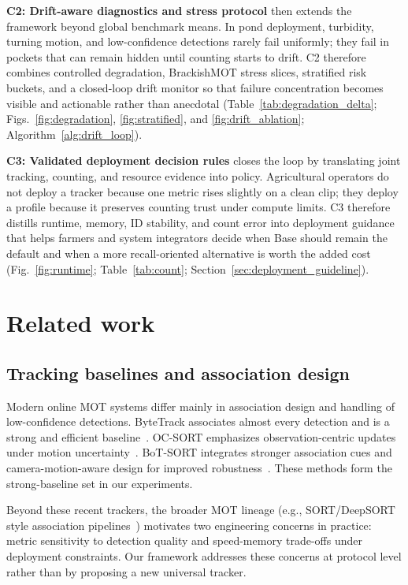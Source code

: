 \documentclass[5p,twocolumn,a4paper]{elsarticle}
\begin{document}
\textbf{C2: Drift-aware diagnostics and stress protocol} then extends the framework beyond global benchmark means. In pond deployment, turbidity, turning motion, and low-confidence detections rarely fail uniformly; they fail in pockets that can remain hidden until counting starts to drift. C2 therefore combines controlled degradation, BrackishMOT stress slices, stratified risk buckets, and a closed-loop drift monitor so that failure concentration becomes visible and actionable rather than anecdotal (Table~\ref{tab:degradation_delta}; Figs.~\ref{fig:degradation}, \ref{fig:stratified}, and \ref{fig:drift_ablation}; Algorithm~\ref{alg:drift_loop}).

\textbf{C3: Validated deployment decision rules} closes the loop by translating joint tracking, counting, and resource evidence into policy. Agricultural operators do not deploy a tracker because one metric rises slightly on a clean clip; they deploy a profile because it preserves counting trust under compute limits. C3 therefore distills runtime, memory, ID stability, and count error into deployment guidance that helps farmers and system integrators decide when Base should remain the default and when a more recall-oriented alternative is worth the added cost (Fig.~\ref{fig:runtime}; Table~\ref{tab:count}; Section~\ref{sec:deployment_guideline}).

\section{Related work}
\subsection{Tracking baselines and association design}
Modern online MOT systems differ mainly in association design and handling of low-confidence detections. ByteTrack associates almost every detection and is a strong and efficient baseline~\cite{bytetrack2022}. OC-SORT emphasizes observation-centric updates under motion uncertainty~\cite{ocsort2022}. BoT-SORT integrates stronger association cues and camera-motion-aware design for improved robustness~\cite{botsort2022}. These methods form the strong-baseline set in our experiments.

Beyond these recent trackers, the broader MOT lineage (e.g., SORT/DeepSORT style association pipelines~\cite{sort2016,deepsort2017}) motivates two engineering concerns in practice: metric sensitivity to detection quality and speed-memory trade-offs under deployment constraints. Our framework addresses these concerns at protocol level rather than by proposing a new universal tracker.
\end{document}
